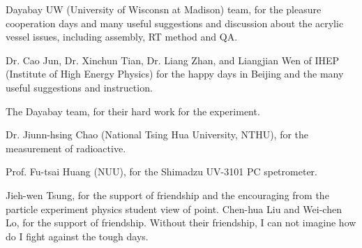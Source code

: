 \begin{acknowledgements}
Dayabay UW (University of Wisconsn at Madison) team, for the pleasure cooperation days
and many useful suggestions and discussion about the acrylic vessel issues, including assembly, RT method and QA.

Dr. Cao Jun, Dr. Xinchun Tian, Dr. Liang Zhan, and Liangjian Wen of IHEP (Institute of High Energy Physics)
for the happy days in Beijing and the many useful suggestions and instruction.

The Dayabay team, for their hard work for the experiment.

Dr. Jiunn-hsing Chao (National Tsing Hua University, NTHU), for the measurement of radioactive.

Prof. Fu-tsai Huang (NUU), for the Shimadzu UV-3101 PC spetrometer.

Jieh-wen Tsung, for the support of friendship and the encouraging from the particle experiment physics student view of point.
Chen-hua Liu and Wei-chen Lo, for the support of friendship. Without their friendship, I can not imagine how
do I fight against the tough days.








%
%
%
%
%
%
%
%
%
%
%
%
%
%
%
%
\end{acknowledgements}

